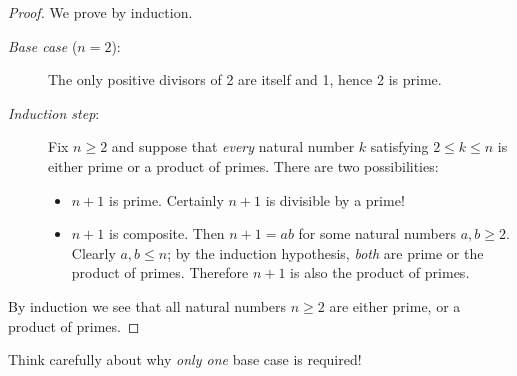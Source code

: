 \begin{proof}
	We prove by induction.
	\begin{description}
		\item[\normalfont\emph{Base case} ($n=2$):] The only positive divisors of 2 are itself and 1, hence 2 is prime.
		\item[\normalfont\emph{Induction step}:] Fix $n\ge 2$ and suppose that \emph{every} natural number $k$ satisfying $2\le k\le n$ is either prime or a product of primes. There are two possibilities:
		\begin{itemize}
		  \item $n+1$ is prime. Certainly $n+1$ is divisible by a prime!
		  \item $n+1$ is composite. Then $n+1=ab$ for some natural numbers $a,b\ge 2$. Clearly $a,b\le n$; by the induction hypothesis, \emph{both} are prime or the product of primes. Therefore $n+1$ is also the product of primes.
		\end{itemize}
	\end{description}
	By induction we see that all natural numbers $n\ge 2$ are either prime, or a product of primes.
\end{proof}

Think carefully about why \emph{only one} base case is required!


